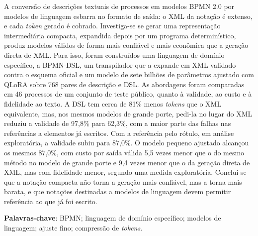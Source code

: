 A conversão de descrições textuais de processos em modelos BPMN 2.0 por modelos de linguagem esbarra no formato de saída: o XML da notação é extenso, e cada \textit{token} gerado é cobrado. Investiga-se se gerar uma representação intermediária compacta, expandida depois por um programa determinístico, produz modelos válidos de forma mais confiável e mais econômica que a geração direta de XML. Para isso, foram construídos uma linguagem de domínio específico, a BPMN-DSL, um transpilador que a expande em XML validado contra o esquema oficial e um modelo de sete bilhões de parâmetros ajustado com QLoRA sobre 768 pares de descrição e DSL. As abordagens foram comparadas em 46 processos de um conjunto de teste público, quanto à validade, ao custo e à fidelidade ao texto. A DSL tem cerca de 81\% menos \textit{tokens} que o XML equivalente, mas, nos mesmos modelos de grande porte, pedi-la no lugar do XML reduziu a validade de 97,8\% para 62,3\%, com a maior parte das falhas nas referências a elementos já escritos. Com a referência pelo rótulo, em análise exploratória, a validade subiu para 87,0\%. O modelo pequeno ajustado alcançou os mesmos 87,0\%, com custo por saída válida 5,5 vezes menor que o do mesmo método no modelo de grande porte e 9,4 vezes menor que o da geração direta de XML, mas com fidelidade menor, segundo uma medida exploratória. Conclui-se que a notação compacta não torna a geração mais confiável, mas a torna mais barata, e que notações destinadas a modelos de linguagem devem permitir referência ao que já foi escrito.

\textbf{Palavras-chave}: BPMN; linguagem de domínio específico; modelos de linguagem; ajuste fino; compressão de \textit{tokens}.
